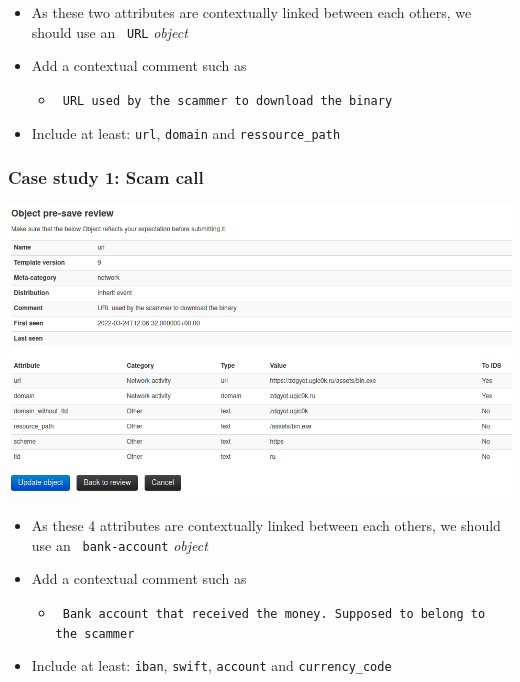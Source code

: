 \begin{frame}
    \begin{itemize}
        \item As these two attributes are contextually linked between each others, we should use an \texttt{\color{black} URL} \textit{object}
        \item Add a contextual comment such as
        \begin{itemize}
            \item \texttt{\color{black} URL used by the scammer to download the binary}
        \end{itemize}
        \item Include at least: \texttt{url}, \texttt{domain} and \texttt{ressource\_path}
    \end{itemize}
\end{frame}

\begin{frame}
    \frametitle{Case study 1: Scam call}
    \begin{center}
        \includegraphics[width=1.0\linewidth]{pictures/case1/object-url.png}
    \end{center}
\end{frame}

\begin{frame}
    \begin{itemize}
        \item As these 4 attributes are contextually linked between each others, we should use an \texttt{\color{black} bank-account} \textit{object}
        \item Add a contextual comment such as
        \begin{itemize}
            \item \texttt{\color{black} Bank account that received the money. Supposed to belong to the scammer}
        \end{itemize}
        \item Include at least: \texttt{iban}, \texttt{swift}, \texttt{account} and \texttt{currency\_code}
    \end{itemize}
\end{frame}

